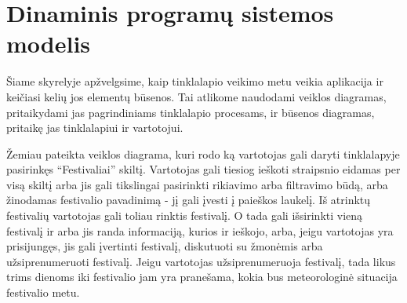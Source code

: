 ﻿\documentclass{VUMIFPSkursinis}
\begin{document}
\section{Dinaminis programų sistemos modelis}

Šiame skyrelyje apžvelgsime, kaip tinklalapio veikimo metu veikia aplikacija ir keičiasi kelių jos elementų būsenos. Tai atlikome naudodami veiklos diagramas, pritaikydami jas pagrindiniams tinklalapio procesams, ir būsenos diagramas, pritaikę jas tinklalapiui ir vartotojui.


Žemiau pateikta veiklos diagrama, kuri rodo ką vartotojas gali daryti tinklalapyje pasirinkęs “Festivaliai” skiltį. Vartotojas gali tiesiog ieškoti straipsnio eidamas per visą skiltį arba jis gali tikslingai pasirinkti rikiavimo arba filtravimo būdą, arba žinodamas festivalio pavadinimą - jį gali įvesti į paieškos laukelį. Iš atrinktų festivalių vartotojas gali toliau rinktis festivalį. O tada gali išsirinkti vieną festivalį ir arba jis randa informaciją, kurios ir ieškojo, arba, jeigu vartotojas yra prisijungęs, jis gali įvertinti festivalį, diskutuoti su žmonėmis arba užsiprenumeruoti festivalį. Jeigu vartotojas užsiprenumeruoja festivalį, tada likus trims dienoms iki festivalio jam yra pranešama, kokia bus meteorologinė situacija festivalio metu.
\end{document}
